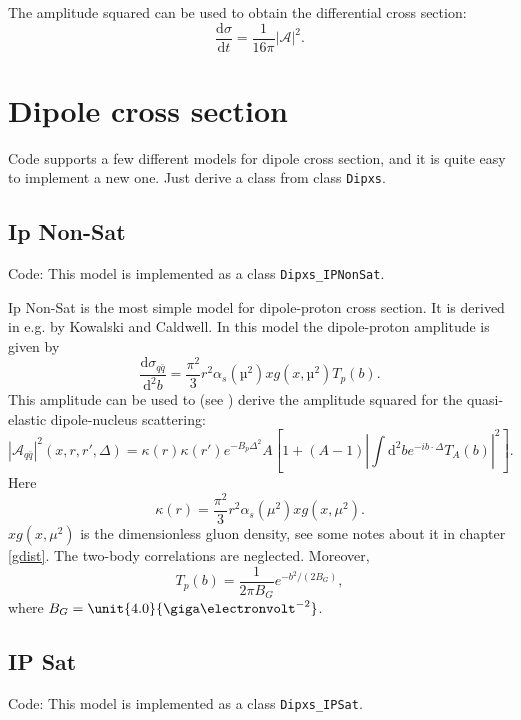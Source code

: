 \documentclass[a4paper,12pt]{article}
\newcommand{\code}[1]{\texttt{#1}}
\newcommand{\der}{\mathrm{d}}
\newcommand{\A}{\mathcal{A}}
\begin{document}
The amplitude squared can be used to obtain the differential cross section:
\begin{equation}
	\frac{\der \sigma}{\der t} = \frac{1}{16\pi} |\A|^2 .
\end{equation}

\section{Dipole cross section}
Code supports a few different models for dipole cross section, and it is quite easy to implement a new one. Just derive a class from class \code{Dipxs}.

\subsection{Ip Non-Sat}
Code: This model is implemented as a class \code{Dipxs\_IPNonSat}.

Ip Non-Sat is the most simple model for dipole-proton cross section. It is derived in e.g. \cite{Caldwell:2009ke} by Kowalski and Caldwell. In this model the dipole-proton amplitude is given by
\begin{equation}
	\label{eq:nonsat-d2b}
	\frac{\der \sigma_{q\bar q}}{\der^2 b} = \frac{\pi^2}{3}r^2 \alpha_s(µ^2)xg(x,µ^2) T_p(b). 
\end{equation}
This amplitude can be used to (see \cite{Caldwell:2009ke}) derive the amplitude squared for the quasi-elastic dipole-nucleus scattering:
\begin{equation}
	|\A_{q\bar q}|^2(x,r,r',\Delta) = \kappa(r) \kappa(r') e^{-B_p \Delta^2} A  \left[ 1 + (A-1) \left| \int \der^2 b e^{-ib \cdot \Delta} T_A(b)\right|^2 \right] . 
\end{equation}
Here 
\begin{equation}
	\label{eq:kappa}
	\kappa(r) = \frac{\pi^2}{3}r^2\alpha_s(\mu^2)xg(x,\mu^2).
\end{equation}
$xg(x,\mu^2)$ is the dimensionless gluon density, see some notes about it in chapter \ref{gdist}. The two-body correlations are neglected. Moreover,
\begin{equation}
	T_p(b) = \frac{1}{2\pi B_G}e^{-b^2/(2B_G)},
\end{equation}
where $B_G=\unit{4.0}{\giga\electronvolt^{-2}}$.

\subsection{IP Sat}
\label{ipsat}
Code: This model is implemented as a class \code{Dipxs\_IPSat}.
\end{document}
